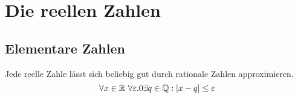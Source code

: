 \pagebreak
\chapter{Die reellen Zahlen}




\section{Elementare Zahlen}
\begin{theorem}
Jede reelle Zahle lässt sich beliebig gut durch rationale Zahlen approximieren.
$$\forall x\in \mathbb{R} \ \forall \varepsilon . 0 \exists q \in \mathbb{Q}: |x-q| \leq \varepsilon$$
\end{theorem}

